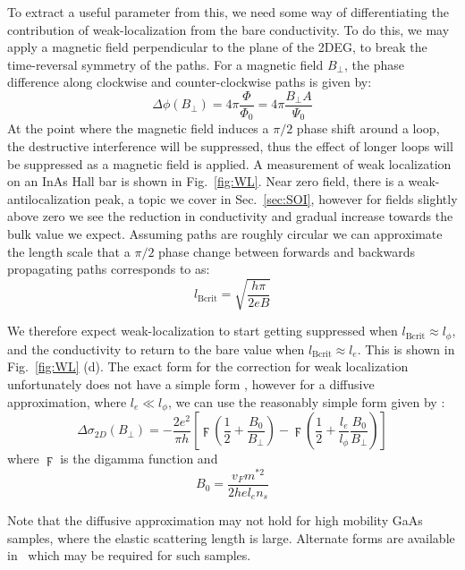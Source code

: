 To extract a useful parameter from this, we need some way of differentiating the contribution of weak-localization from
the bare conductivity. To do this, we may apply a magnetic field perpendicular to the plane of the 2DEG, to break the time-reversal symmetry of the paths. For a magnetic field $B_\perp$, the phase difference along clockwise and counter-clockwise paths
is given by:
\begin{equation}
  \Delta \phi(B_\perp) = 4 \pi \frac{\Phi}{\Phi_0} = 4\pi \frac{B_\perp A}{\Psi_0}
\end{equation}
At the point where the magnetic field induces a $\pi/2$ phase shift around a loop, the destructive interference will be suppressed, thus the
effect of longer loops will be suppressed as a magnetic field is applied. A measurement of weak localization on an InAs Hall bar is shown in
Fig.~\ref{fig:WL}. Near zero field, there is a weak-antilocalization peak, a topic we cover in Sec.~\ref{sec:SOI}, however for fields
slightly above zero we see the reduction in conductivity and gradual increase towards the bulk value we expect.
Assuming paths are roughly circular we can approximate the length scale that a $\pi/2$ phase change between forwards and backwards
propagating paths corresponds to as:
\begin{equation}
  l_\textrm{Bcrit} = \sqrt{\frac{h \pi}{2 e B}}
\end{equation}

We therefore expect weak-localization to start getting suppressed when $l_\textrm{Bcrit} \approx l_\phi$, and the conductivity to return to the bare
value when $l_\textrm{Bcrit} \approx l_e$. This is shown in Fig.~\ref{fig:WL} (d). The exact form for the correction for weak localization unfortunately does not have
a simple form \cite{PhysRevB.70.245311}, however for a diffusive approximation, where $l_e \ll l_\phi$, we can use the reasonably simple form
given by \cite{10.1143/PTP.63.707}:
\begin{equation}
  \Delta \sigma_{2D}(B_\perp) = -\frac{2 e^2}{\pi h}\left[\digamma\left(\frac{1}{2} + \frac{B_0}{B_\perp}\right) - \digamma\left(\frac{1}{2} + \frac{l_e}{l_\phi}\frac{B_0}{B_\perp}\right)\right]
\end{equation}
where $\digamma$ is the digamma function and
\begin{equation}
  B_0 = \frac{v_F m^{*2}}{2 h e l_e n_s}
\end{equation}

Note that the diffusive approximation may not hold for high mobility GaAs samples, where the elastic scattering length is large.
Alternate forms are available in~\cite{PhysRevB.70.245311} which may be required for such samples.

